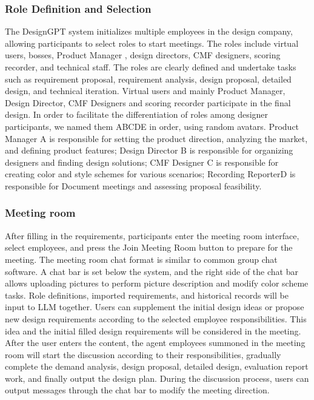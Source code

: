 \documentclass[10pt, conference, compsocconf]{IEEEtran}
\begin{document}
\subsubsection{Role Definition and Selection}
The DesignGPT system initializes multiple employees in the design company, allowing participants to select roles to start meetings. The roles include virtual users, bosses, Product Manager , design directors, CMF designers, scoring recorder, and technical staff. The roles are clearly defined and undertake tasks such as requirement proposal, requirement analysis, design proposal, detailed design, and technical iteration. Virtual users and mainly Product Manager, Design Director, CMF Designers and scoring recorder participate in the final design. In order to facilitate the differentiation of roles among designer participants, we named them ABCDE in order, using random avatars. Product Manager A is responsible for setting the product direction, analyzing the market, and defining product features; Design Director B is responsible for organizing designers and finding design solutions; CMF Designer C is responsible for creating color and style schemes for various scenarios; Recording ReporterD is responsible for Document meetings and assessing proposal feasibility.

\subsubsection{Meeting room}
After filling in the requirements, participants enter the meeting room interface, select employees, and press the Join Meeting Room button to prepare for the meeting. The meeting room chat format is similar to common group chat software. A chat bar is set below the system, and the right side of the chat bar allows uploading pictures to perform picture description and modify color scheme tasks. Role definitions, imported requirements, and historical records will be input to LLM together. Users can supplement the initial design ideas or propose new design requirements according to the selected employee responsibilities. This idea and the initial filled design requirements will be considered in the meeting. After the user enters the content, the agent employees summoned in the meeting room will start the discussion according to their responsibilities, gradually complete the demand analysis, design proposal, detailed design, evaluation report work, and finally output the design plan. During the discussion process, users can output messages through the chat bar to modify the meeting direction.
\end{document}
